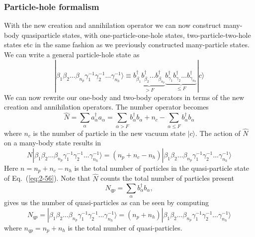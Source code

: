 \documentclass{beamer}
\begin{document}
\begin{frame}
\frametitle{Particle-hole formalism}

\begin{block}{}
With the new creation and annihilation operator  we can now construct 
many-body quasiparticle states, with one-particle-one-hole states, two-particle-two-hole
states etc in the same fashion as we previously constructed many-particle states. 
We can write a general particle-hole state as
\begin{equation}
	|\beta_1\beta_2\dots \beta_{n_p} \gamma_1^{-1} \gamma_2^{-1} \dots \gamma_{n_h}^{-1}\rangle \equiv
		\underbrace{b_{\beta_1}^\dagger b_{\beta_2}^\dagger \dots b_{\beta_{n_p}}^\dagger}_{>F}
		\underbrace{b_{\gamma_1}^\dagger b_{\gamma_2}^\dagger \dots b_{\gamma_{n_h}}^\dagger}_{\leq F} |c\rangle \label{eq:2-56}
\end{equation}
We can now rewrite our one-body and two-body operators in terms of the new creation and annihilation operators.
The number operator becomes
\begin{equation}
	\hat{N} = \sum_\alpha a_\alpha^\dagger a_\alpha= 
\sum_{\alpha > F} b_\alpha^\dagger b_\alpha + n_c - \sum_{\alpha \leq F} b_\alpha^\dagger b_\alpha \label{eq:2-57b}
\end{equation}
where $n_c$ is the number of particle in the new vacuum state $|c\rangle $.  
The action of $\hat{N}$ on a many-body state results in 
\begin{equation}
	N |\beta_1\beta_2\dots \beta_{n_p} \gamma_1^{-1} \gamma_2^{-1} \dots \gamma_{n_h}^{-1}\rangle = (n_p + n_c - n_h) |\beta_1\beta_2\dots \beta_{n_p} \gamma_1^{-1} \gamma_2^{-1} \dots \gamma_{n_h}^{-1}\rangle \label{2-59}
\end{equation}
Here  $n=n_p +n_c - n_h$ is the total number of particles in the quasi-particle state of 
Eq.~(\ref{eq:2-56}). Note that  $\hat{N}$ counts the total number of particles  present 
\begin{equation}
	N_{qp} = \sum_\alpha b_\alpha^\dagger b_\alpha, \label{eq:2-60}
\end{equation}
gives us the number of quasi-particles as can be seen by computing
\begin{equation}
	N_{qp}= |\beta_1\beta_2\dots \beta_{n_p} \gamma_1^{-1} \gamma_2^{-1} \dots \gamma_{n_h}^{-1}\rangle
		= (n_p + n_h)|\beta_1\beta_2\dots \beta_{n_p} \gamma_1^{-1} \gamma_2^{-1} \dots \gamma_{n_h}^{-1}\rangle \label{eq:2-61}
\end{equation}
where $n_{qp} = n_p + n_h$ is the total number of quasi-particles.
\end{block}
\end{frame}
\end{document}
